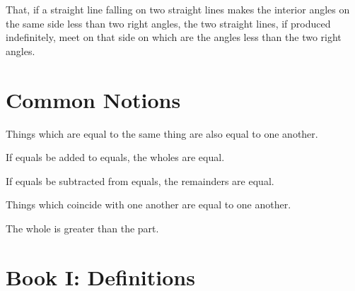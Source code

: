 \documentclass{rrxiv}
\begin{document}
\begin{rrxivremark}
\label{post:5}
That, if a straight line falling on two straight lines makes the
interior angles on the same side less than two right angles, the two
straight lines, if produced indefinitely, meet on that side on which
are the angles less than the two right angles.
\end{rrxivremark}

\section*{Common Notions}
\label{sec:common-notions}

\begin{rrxivremark}
\label{cn:1}
Things which are equal to the same thing are also equal to one another.
\end{rrxivremark}

\begin{rrxivremark}
\label{cn:2}
If equals be added to equals, the wholes are equal.
\end{rrxivremark}

\begin{rrxivremark}
\label{cn:3}
If equals be subtracted from equals, the remainders are equal.
\end{rrxivremark}

\begin{rrxivremark}
\label{cn:4}
Things which coincide with one another are equal to one another.
\end{rrxivremark}

\begin{rrxivremark}
\label{cn:5}
The whole is greater than the part.
\end{rrxivremark}

\section*{Book I: Definitions}
\label{sec:def-bookI}
\end{document}
